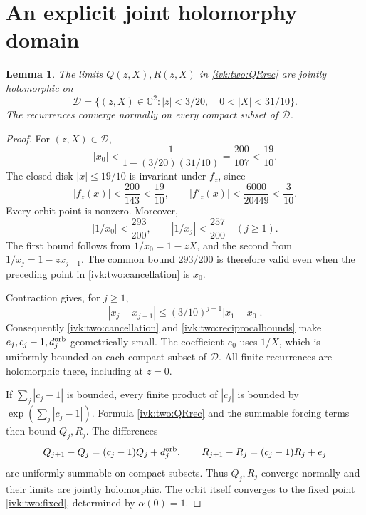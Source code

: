 \documentclass[11pt,letterpaper]{article}
\newtheorem{lemma}[theorem]{Lemma}
\theoremstyle{remark}\newtheorem{remark}[theorem]{Remark}
\newcommand{\C}{\mathbb C}
\begin{document}
\section{An explicit joint holomorphy domain}\label{ivk:two:holomorphy}
\begin{lemma}\label{ivk:two:domainlemma}
The limits $Q(z,X),R(z,X)$ in \eqref{ivk:two:QRrec} are jointly holomorphic on
\begin{equation}\label{ivk:two:productdomain}
 \mathcal D=\{(z,X)\in\C^2:|z|<3/20,\quad0<|X|<31/10\}.
\end{equation}
The recurrences converge normally on every compact subset of
$\mathcal D$.
\end{lemma}
\begin{proof}
For $(z,X)\in\mathcal D$,
\[
 |x_0|<\frac1{1-(3/20)(31/10)}=\frac{200}{107}<\frac{19}{10}.
\]
The closed disk $|x|\le19/10$ is invariant under $f_z$, since
\begin{equation}\label{ivk:two:contractbounds}
 |f_z(x)|<\frac{200}{143}<\frac{19}{10},\qquad
 |f'_z(x)|<\frac{6000}{20449}<\frac3{10}.
\end{equation}
Every orbit point is nonzero. Moreover,
\begin{equation}\label{ivk:two:reciprocalbounds}
 |1/x_0|<\frac{293}{200},\qquad
 |1/x_j|<\frac{257}{200}\quad(j\ge1).
\end{equation}
The first bound follows from $1/x_0=1-zX$, and the second from
$1/x_j=1-zx_{j-1}$. The common bound $293/200$ is therefore valid even
when the preceding point in \eqref{ivk:two:cancellation} is $x_0$.

Contraction gives, for $j\ge1$,
\[
 |x_j-x_{j-1}|\le(3/10)^{j-1}|x_1-x_0|.
\]
Consequently \eqref{ivk:two:cancellation} and \eqref{ivk:two:reciprocalbounds} make
$e_j,c_j-1,d_j^{\rm orb}$ geometrically small. The coefficient $e_0$
uses $1/X$, which is uniformly bounded on each compact subset of
$\mathcal D$. All finite recurrences are holomorphic there, including
at $z=0$.

If $\sum_j|c_j-1|$ is bounded, every finite product of $|c_j|$ is
bounded by $\exp(\sum_j|c_j-1|)$. Formula \eqref{ivk:two:QRrec} and the
summable forcing terms then bound $Q_j,R_j$. The differences
\[
 Q_{j+1}-Q_j=(c_j-1)Q_j+d_j^{\rm orb},\qquad
 R_{j+1}-R_j=(c_j-1)R_j+e_j
\]
are uniformly summable on compact subsets. Thus $Q_j,R_j$ converge
normally and their limits are jointly holomorphic. The orbit itself
converges to the fixed point \eqref{ivk:two:fixed}, determined by
$\alpha(0)=1$.
\end{proof}
\end{document}
